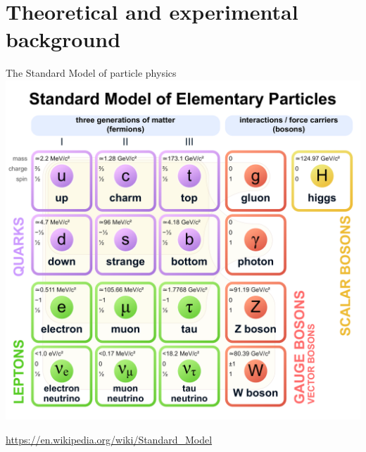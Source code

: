 \documentclass[aspectratio=1610, 10pt]{beamer}
\begin{document}
\section*{Theoretical and experimental background}

\begin{frame}{The Standard Model of particle physics}
  \centering
  \includegraphics[height=0.9\textheight]{images/standard_model.pdf}

  \tiny \url{https://en.wikipedia.org/wiki/Standard_Model}
\end{frame}
\end{document}
